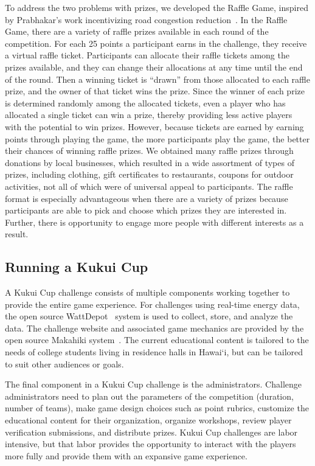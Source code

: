 \documentclass[10pt, conference, compsocconf]{IEEEtran-old}
\newcommand{\Hawaii}{Hawai`i\xspace}
\begin{document}
To address the two problems with prizes, we developed the Raffle Game, inspired by Prabhakar's work incentivizing road congestion reduction~\cite{Merugu2009}. In the Raffle Game, there are a variety of raffle prizes available in each round of the competition. For each 25 points a participant earns in the challenge, they receive a virtual raffle ticket. Participants can allocate their raffle tickets among the prizes available, and they can change their allocations at any time until the end of the round. Then a winning ticket is ``drawn'' from those allocated to each raffle prize, and the owner of that ticket wins the prize. Since the winner of each prize is determined randomly among the allocated tickets, even a player who has allocated a single ticket can win a prize, thereby providing less active players with the potential to win prizes. However, because tickets are earned by earning points through playing the game, the more participants play the game, the better their chances of winning raffle prizes. We obtained many raffle prizes through donations by local businesses, which resulted in a wide assortment of types of prizes, including clothing, gift certificates to restaurants, coupons for outdoor activities, not all of which were of universal appeal to participants. The raffle format is especially advantageous when there are a variety of prizes because participants are able to pick and choose which prizes they are interested in. Further, there is opportunity to engage more people with different interests as a result.

\subsection{Running a Kukui Cup}

A Kukui Cup challenge consists of multiple components working together to provide the entire game experience. For challenges using real-time energy data, the open source WattDepot~\cite{csdl2-10-05} system is used to collect, store, and analyze the data. The challenge website and associated game mechanics are provided by the open source Makahiki system~\cite{csdl2-11-01, csdl2-12-06}. The current educational content is tailored to the needs of college students living in residence halls in \Hawaii, but can be tailored to suit other audiences or goals.

The final component in a Kukui Cup challenge is the administrators. Challenge administrators need to plan out the parameters of the competition (duration, number of teams), make game design choices such as point rubrics, customize the educational content for their organization, organize workshops, review player verification submissions, and distribute prizes. Kukui Cup challenges are labor intensive, but that labor provides the opportunity to interact with the players more fully and provide them with an expansive game experience.
\end{document}
